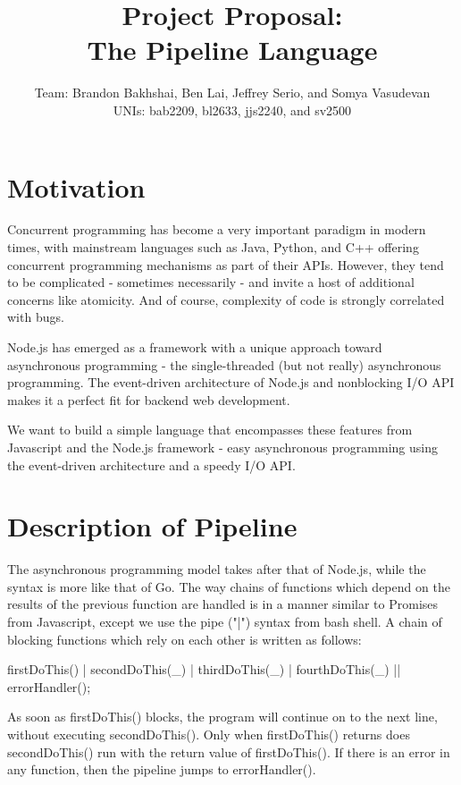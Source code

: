 \documentclass[11pt]{article}
\title{\textbf{Project Proposal:\\ The Pipeline Language}}
\author{Team: Brandon Bakhshai, Ben Lai, Jeffrey Serio, and Somya Vasudevan \\ UNIs: bab2209, bl2633, jjs2240, and sv2500}
\begin{document}
\maketitle
\thispagestyle{empty}
\renewcommand{\thesubsubsection}{\thesubsection.\alph{subsubsection}.} 


\section{Motivation}
\hspace{0.5cm} Concurrent programming has become a very important paradigm in modern times, with mainstream languages such as Java, Python, and C++ offering concurrent programming mechanisms as part of their APIs. However, they tend to be complicated - sometimes necessarily - and invite a host of additional concerns like atomicity. And of course, complexity of code is strongly correlated with bugs. 

Node.js has emerged as a framework with a unique approach toward asynchronous programming - the single-threaded (but not really) asynchronous programming. The event-driven architecture of Node.js and nonblocking I/O API makes it a perfect fit for backend web development.

We want to build a simple language that encompasses these features from Javascript and the Node.js framework - easy asynchronous programming using the event-driven architecture and a speedy I/O API.

\section{Description of Pipeline}
\hspace{0.5cm} The asynchronous programming model takes after that of Node.js, while the syntax is more like that of Go. The way chains of functions which depend on the results of the previous function are handled is in a manner similar to Promises from Javascript, except we use the pipe ("|") syntax from bash shell. A chain of blocking functions which rely on each other is written as follows:

firstDoThis() | secondDoThis(_) | thirdDoThis(_) | fourthDoThis(_) || errorHandler();

As soon as firstDoThis() blocks, the program will continue on to the next line, without executing secondDoThis(). Only when firstDoThis() returns does secondDoThis() run with the return value of firstDoThis(). If there is an error in any function, then the pipeline jumps to errorHandler().
\end{document}
